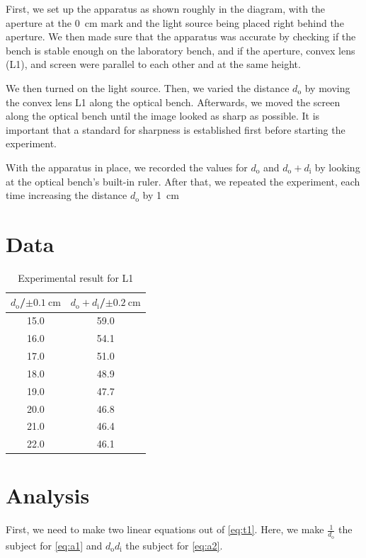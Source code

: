 \documentclass[letter,12pt]{article}
\numberwithin{equation}{section}
\numberwithin{figure}{section}
\numberwithin{table}{section}
\newcommand{\dist}[1] {\(d_{\mathrm{#1}}\)}
\newcommand{\mdist}[1] {d_{\mathrm{#1}}}
\begin{document}
First, we set up the apparatus as shown roughly in the diagram, with the aperture at the \SI{0}{\cm} mark and the light source being placed right behind the aperture. We then made sure that the apparatus was accurate by checking if the bench is stable enough on the laboratory bench, and if the aperture, convex lens (L1), and screen were parallel to each other and at the same height. 

We then turned on the light source. Then, we varied the distance \dist{o} by moving the convex lens L1 along the optical bench. Afterwards, we moved the screen along the optical bench until the image looked as sharp as possible. It is important that a standard for sharpness is established first before starting the experiment.

With the apparatus in place, we recorded the values for \dist{o} and \(\mdist{o} + \mdist{i}\) by looking at the optical bench’s built-in ruler. After that, we repeated the experiment, each time increasing the distance \dist{o} by \SI{1}{\cm}

\pagebreak[4]
\section{Data}
\begin{table}[!ht]
  \centering
  \begin{tabular}{cc}
    \toprule
    {\(\mdist{o}\)/\(\pm \SI{0.1}{\cm}\)} & {\(\mdist{o} + \mdist{i}\)/\(\pm \SI{0.2}{\cm}\)} \\
    \midrule
    15.0 & 59.0 \\
    16.0 & 54.1 \\
    17.0 & 51.0 \\
    18.0 & 48.9 \\
    19.0 & 47.7 \\
    20.0 & 46.8 \\
    21.0 & 46.4 \\
    22.0 & 46.1 \\
    \bottomrule
  \end{tabular}
  \caption{Experimental result for L1}
  \label{table:d1}
\end{table}

\section{Analysis}
First, we need to make two linear equations out of \eqref{eq:t1}. Here, we make \(\frac{1}{\mdist{o}}\) the subject for \eqref{eq:a1} and \(\mdist{o} \mdist{i}\) the subject for \eqref{eq:a2}.
\end{document}
